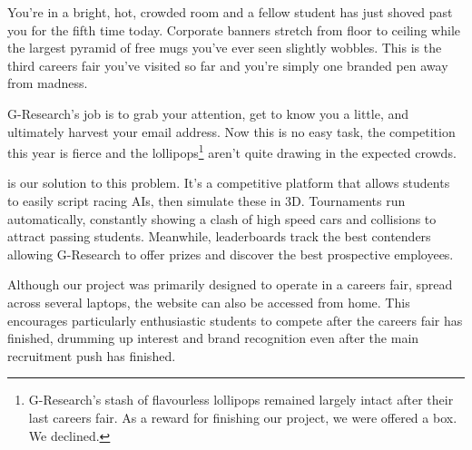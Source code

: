 You're in a bright, hot, crowded room and a fellow student has just shoved past you for the fifth time today. Corporate banners stretch from floor to ceiling while the largest pyramid of free mugs you've ever seen slightly wobbles. This is the third careers fair you've visited so far and you're simply one branded pen away from madness.

G-Research's job is to grab your attention, get to know you a little, and ultimately harvest your email address. Now this is no easy task, the competition this year is fierce and the lollipops\footnote{G-Research's stash of flavourless lollipops remained largely intact after their last careers fair. As a reward for finishing our project, we were offered a box. We declined.} aren't quite drawing in the expected crowds.

\project is our solution to this problem. It's a competitive platform that allows students to easily script racing AIs, then simulate these in 3D. Tournaments run automatically, constantly showing a clash of high speed cars and collisions to attract passing students. Meanwhile, leaderboards track the best contenders allowing G-Research to offer prizes and discover the best prospective employees. 

Although our project was primarily designed to operate in a careers fair, spread across several laptops, the website can also be accessed from home. This encourages particularly enthusiastic students to compete after the careers fair has finished, drumming up interest and brand recognition even after the main recruitment push has finished.
